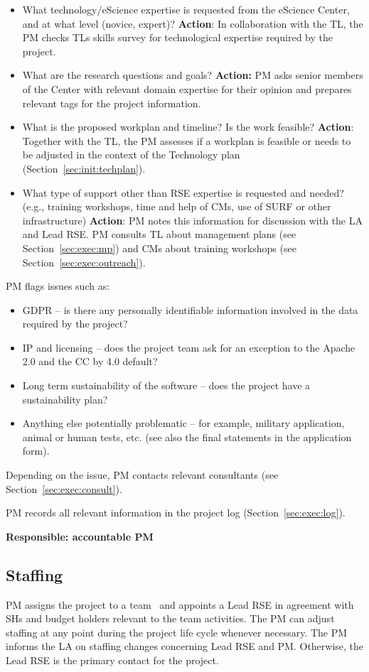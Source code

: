 \begin{itemize}
\item What technology/eScience expertise is requested from the eScience Center, and at what level (novice, expert)?
\textbf{Action}: In collaboration with the TL, the PM checks TLs skills survey for technological expertise required by the project.
\item What are the research questions and goals? \textbf{Action:} PM asks senior members of the Center with relevant domain
expertise for their opinion and prepares relevant tags for the project information.
\item What is the proposed workplan and timeline? Is the work feasible? \textbf{Action}: Together with the TL, the PM assesses
if a workplan is feasible or needs to be adjusted in the context of the Technology plan (Section~\ref{sec:init:techplan}).
\item What type of support other than RSE expertise is requested and needed? (e.g., training workshops, time and help of CMs,
use of SURF or other infrastructure) \textbf{Action}: PM notes this information for discussion with the LA and Lead
RSE. PM consults TL about management plans (see Section~\ref{sec:exec:mp}) and CMs about training workshops (see
Section~\ref{sec:exec:outreach}).
\end{itemize}
PM flags issues such as:
\begin{itemize}
\item GDPR – is there any personally identifiable information involved in the data required by the project? 
\item IP and licensing – does the project team ask for an exception to the Apache 2.0 and the CC by 4.0 default? 
\item Long term sustainability of the software – does the project have a sustainability plan? 
\item Anything else potentially problematic – for example, military application, animal or human tests, etc. (see also the
final statements in the application form).
\end{itemize}

Depending on the issue, PM contacts relevant consultants (see Section~\ref{sec:exec:consult}).

PM records all relevant information in the project log (Section~\ref{sec:exec:log}).

\textbf{Responsible: accountable PM}



\subsection{Staffing}
\label{sec:init:vacancy}
PM assigns the project to a team~\cite{rse-teams} and appoints a Lead RSE in agreement with SHs and budget
holders relevant to the team activities. The PM can adjust staffing at any point during the project life cycle
whenever necessary. The PM informs the LA on staffing changes concerning Lead RSE and PM. 
Otherwise, the Lead RSE is the primary contact for the project.

